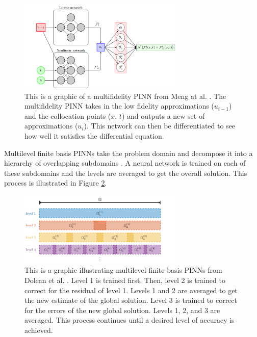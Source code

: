 \documentclass[12pt]{article}
\begin{document}
\begin{figure}[h]
\center
\includegraphics[width = 0.7\textwidth]{imgs/mfpinns2}
\caption{This is a graphic of a multifidelity PINN from Meng at al. \cite{mfpinns}. The multifidelity PINN takes in the low fidelity approximations ($u_{i-1}$) and the collocation points ($x$, $t$) and outputs a new set of approximations ($u_i$). This network can then be differentiated to see how well it satisfies the differential equation.}
\label{fig:mfpinn}
\end{figure} 

\par Multilevel finite basis PINNs take the problem domain and decompose it into a hierarchy of overlapping subdomains \cite{fbpinns}. A neural network is trained on each of these subdomains and the levels are averaged to get the overall solution. This process is illustrated in Figure \ref{fig:fbpinn}.

\begin{figure}[t]
\center
\includegraphics[width = 0.7\textwidth]{imgs/domain_decomp2}
\caption{This is a graphic illustrating multilevel finite basis PINNs from Dolean et al. \cite{fbpinns}. Level 1 is trained first. Then, level 2 is trained to correct for the residual of level 1. Levels 1 and 2 are averaged to get the new estimate of the global solution. Level 3 is trained to correct for the errors of the new global solution. Levels 1, 2, and 3 are averaged. This process continues until a desired level of accuracy is achieved.}
\label{fig:fbpinn}
\end{figure} 
\end{document}
